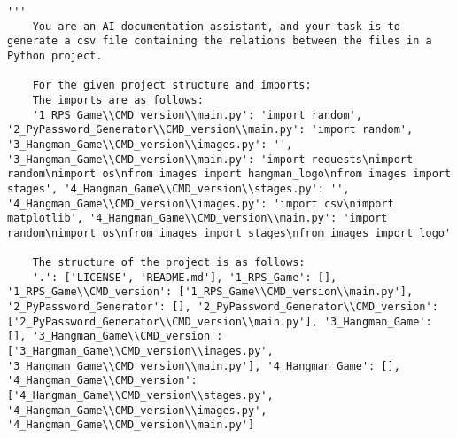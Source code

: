 \begin{verbatim}
'''
    You are an AI documentation assistant, and your task is to generate a csv file containing the relations between the files in a Python project.

    For the given project structure and imports:
    The imports are as follows:
    '1_RPS_Game\\CMD_version\\main.py': 'import random', '2_PyPassword_Generator\\CMD_version\\main.py': 'import random', '3_Hangman_Game\\CMD_version\\images.py': '', '3_Hangman_Game\\CMD_version\\main.py': 'import requests\nimport random\nimport os\nfrom images import hangman_logo\nfrom images import stages', '4_Hangman_Game\\CMD_version\\stages.py': '', '4_Hangman_Game\\CMD_version\\images.py': 'import csv\nimport matplotlib', '4_Hangman_Game\\CMD_version\\main.py': 'import random\nimport os\nfrom images import stages\nfrom images import logo'

    The structure of the project is as follows:
    '.': ['LICENSE', 'README.md'], '1_RPS_Game': [], '1_RPS_Game\\CMD_version': ['1_RPS_Game\\CMD_version\\main.py'], '2_PyPassword_Generator': [], '2_PyPassword_Generator\\CMD_version': ['2_PyPassword_Generator\\CMD_version\\main.py'], '3_Hangman_Game': [], '3_Hangman_Game\\CMD_version': ['3_Hangman_Game\\CMD_version\\images.py', '3_Hangman_Game\\CMD_version\\main.py'], '4_Hangman_Game': [], '4_Hangman_Game\\CMD_version': ['4_Hangman_Game\\CMD_version\\stages.py', '4_Hangman_Game\\CMD_version\\images.py', '4_Hangman_Game\\CMD_version\\main.py']


\end{verbatim}
